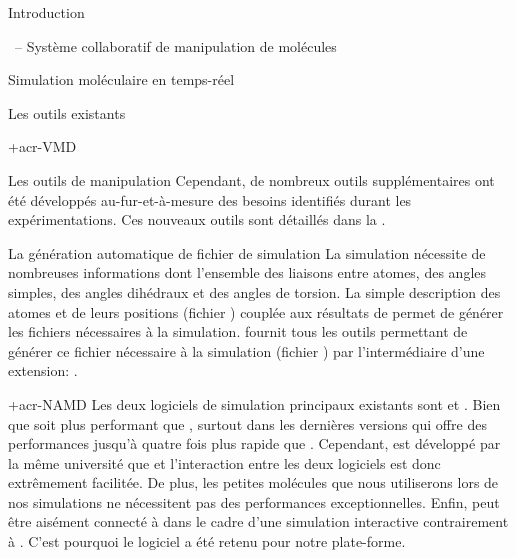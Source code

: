 \documentclass[myfrancais]{mythesis}
\begin{document}
\begin{mypart}{Introduction}
\begin{mychapter}{\myShaddock\ -- Système collaboratif de manipulation de molécules}
\begin{mysection}{Simulation moléculaire en temps-réel}
\begin{mysubsection}{Les outils existants}
\begin{mysubsubsection}{\myacronl+{acr-VMD}}
\begin{myparagraph}{Les outils de manipulation}
							Cependant, de nombreux outils supplémentaires ont été développés au-fur-et-à-mesure des besoins identifiés durant les expérimentations.
							Ces nouveaux outils sont détaillés dans la .
						\end{myparagraph}
						\begin{myparagraph}{La génération automatique de fichier de simulation}
							La simulation nécessite de nombreuses informations dont l'ensemble des liaisons entre atomes, des angles simples, des angles dihédraux et des angles de torsion.
							La simple description des atomes et de leurs positions (fichier \myPDB) couplée aux résultats de \myCHARMM {} permet de générer les fichiers nécessaires à la simulation.
							 fournit tous les outils permettant de générer ce fichier nécessaire à la simulation (fichier \myPSF) par l'intermédiaire d'une extension: .
						\end{myparagraph}
					\end{mysubsubsection}
					\begin{mysubsubsection}{\myacronl+{acr-NAMD}}
						Les deux logiciels de simulation principaux existants sont   et \myGromacs {}.
						Bien que \myGromacs soit plus performant que , surtout dans les dernières versions  qui offre des performances jusqu'à quatre fois plus rapide que .
						Cependant,  est développé par la même université que  et l'interaction entre les deux logiciels est donc extrêmement facilitée.
						De plus, les petites molécules que nous utiliserons lors de nos simulations ne nécessitent pas des performances exceptionnelles.
						Enfin,  peut être aisément connecté à  dans le cadre d'une simulation interactive  contrairement à \myGromacs.
						C'est pourquoi le logiciel  a été retenu pour notre plate-forme.


\end{mysubsubsection}
\end{mysubsection}
\end{mysection}
\end{mychapter}
\end{mypart}
\end{document}
